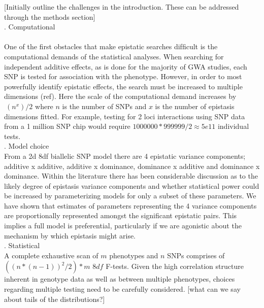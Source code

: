 \documentclass{article}
\begin{document}
[Initially outline the challenges in the introduction. These can be addressed through the methods section] \\
. Computational \\ 
 \\
\newline
One of the first obstacles that make epistatic searches difﬁcult is the computational demands of the statistical analyses. When searching for independent additive effects, as is done for the majority of GWA studies, each SNP is tested for association with the phenotype. However, in order to most powerfully identify epistatic effects, the search must be increased to multiple dimensions (ref). Here the scale of the computational demand increases by $~(n^x)/2$ where $n$ is the number of SNPs and $x$ is the number of epistasis dimensions fitted. For example, testing for 2 loci interactions using SNP data from a 1 million SNP chip would require $1000000 * 999999/2 \approx 5e11$ individual tests. \\     
. Model choice \\
\newline
From a 2d 8df biallelic SNP model there are 4 epistatic variance components; additive x additive, additive x
dominance, dominance x additive and dominance x dominance. Within the literature there has been considerable discussion as to the likely degree of epistasis variance components and whether statistical power could be increased by parameterizing models for only a subset of these parameters. We have shown that estimates of parameters representing the 4 variance components are proportionally represented amongst the significant epistatic pairs. This implies a full model is preferential, particularly if we are agonistic about the mechanism by which epistasis might arise. \\  
. Statistical \\
\newline
A complete exhaustive scan of $m$ phenotypes and $n$ SNPs comprises of $((n*(n-1))^2/2)*m$ $8df$ F-tests. Given the high correlation structure inherent in genotype data as well as between multiple phenotypes, choices regarding multiple testing need to be carefully considered. [what can we say about tails of the distributions?]
\end{document}

